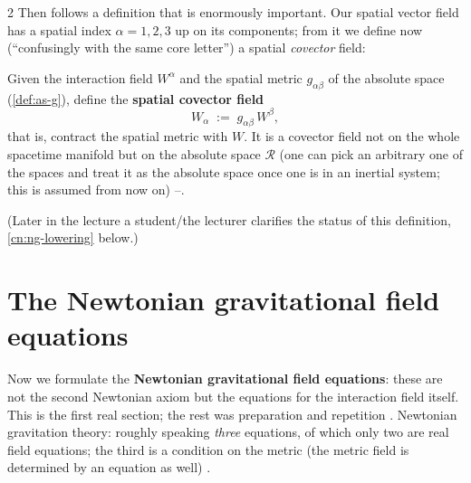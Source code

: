 \begin{paracol}{2}
Then follows a definition that is enormously important. Our spatial vector field has a spatial index $\alpha=1,2,3$ up on its components; from it we define now (``confusingly with the same core letter'') a spatial \emph{covector} field:
\begin{definition}\label{def:ng-covector}
Given the interaction field $W^\alpha$ and the spatial metric $g_{\alpha\beta}$ of the absolute space (\cref{def:as-g}), define the \textbf{spatial covector field}
\begin{equation}\label{eq:ng-covector}
  W_\alpha\;:=\;g_{\alpha\beta}\,W^\beta ,
\end{equation}
that is, contract the spatial metric with $W$. It is a covector field not on the whole spacetime manifold but on the absolute space $\mathcal R$ (one can pick an arbitrary one of the spaces and treat it as the absolute space once one is in an inertial system; this is assumed from now on) --.
\end{definition}
(Later in the lecture a student/the lecturer clarifies the status of this definition, \cref{cn:ng-lowering} below.)

\section{The Newtonian gravitational field equations}\label{sec:ng-equations}

Now we formulate the \textbf{Newtonian gravitational field equations}: these are not the second Newtonian axiom but the equations for the interaction field itself. This is the first real section; the rest was preparation and repetition . Newtonian gravitation theory: roughly speaking \emph{three} equations, of which only two are real field equations; the third is a condition on the metric
(the metric field is determined by an equation as well) .


\end{paracol}
